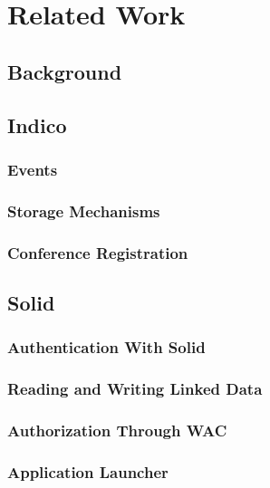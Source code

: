 \chapter{Related Work}
\setcounter{section}{0}

\section{Background}

\section{Indico}

\subsection{Events}

\subsection{Storage Mechanisms}

\subsection{Conference Registration}

\section{Solid}

\subsection{Authentication With Solid}

\subsection{Reading and Writing Linked Data}

\subsection{Authorization Through WAC}

\subsection{Application Launcher}
